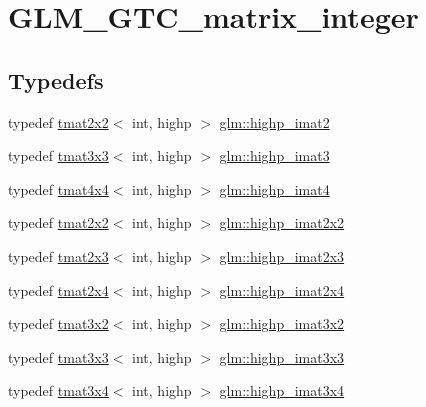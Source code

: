 \hypertarget{group__gtc__matrix__integer}{}\section{G\+L\+M\+\_\+\+G\+T\+C\+\_\+matrix\+\_\+integer}
\label{group__gtc__matrix__integer}
\subsection*{Typedefs}
\begin{DoxyCompactItemize}
\item 
typedef \hyperlink{structglm_1_1tmat2x2}{tmat2x2}$<$ int, highp $>$ \hyperlink{group__gtc__matrix__integer_gae1cd6ff099593d2f215bd4ceed538200}{glm\+::highp\+\_\+imat2}
\item 
typedef \hyperlink{structglm_1_1tmat3x3}{tmat3x3}$<$ int, highp $>$ \hyperlink{group__gtc__matrix__integer_ga0766d11d0154f42893ef0912ab7c6a2c}{glm\+::highp\+\_\+imat3}
\item 
typedef \hyperlink{structglm_1_1tmat4x4}{tmat4x4}$<$ int, highp $>$ \hyperlink{group__gtc__matrix__integer_gaa5eedcb20883541c3f7f2862cbd0b446}{glm\+::highp\+\_\+imat4}
\item 
typedef \hyperlink{structglm_1_1tmat2x2}{tmat2x2}$<$ int, highp $>$ \hyperlink{group__gtc__matrix__integer_gab4411f2d106d24a32aaa3cb711dc8510}{glm\+::highp\+\_\+imat2x2}
\item 
typedef \hyperlink{structglm_1_1tmat2x3}{tmat2x3}$<$ int, highp $>$ \hyperlink{group__gtc__matrix__integer_ga6c1a5f4d85de3f7eccb394970320bafc}{glm\+::highp\+\_\+imat2x3}
\item 
typedef \hyperlink{structglm_1_1tmat2x4}{tmat2x4}$<$ int, highp $>$ \hyperlink{group__gtc__matrix__integer_gae7502957eb2ab9268726d87389ae2b55}{glm\+::highp\+\_\+imat2x4}
\item 
typedef \hyperlink{structglm_1_1tmat3x2}{tmat3x2}$<$ int, highp $>$ \hyperlink{group__gtc__matrix__integer_ga2c8dc817124f44bc01f27777bfce983b}{glm\+::highp\+\_\+imat3x2}
\item 
typedef \hyperlink{structglm_1_1tmat3x3}{tmat3x3}$<$ int, highp $>$ \hyperlink{group__gtc__matrix__integer_gaecb62c11fb25aadbb7eecc2da226d444}{glm\+::highp\+\_\+imat3x3}
\item 
typedef \hyperlink{structglm_1_1tmat3x4}{tmat3x4}$<$ int, highp $>$ \hyperlink{group__gtc__matrix__integer_gabcd2d8d764b11db413259ee5cafd8446}{glm\+::highp\+\_\+imat3x4}
\item 

\end{DoxyCompactItemize}

